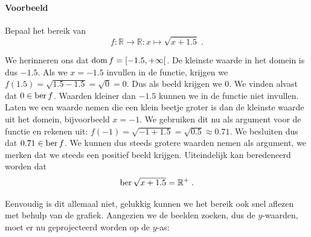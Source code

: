 \documentclass[12pt,twoside]{article}
\begin{document}
\paragraph{Voorbeeld} Bepaal het bereik van $$f:\mathbb{R}\to\mathbb{R}:x\mapsto \sqrt{x+1.5}\;.$$

We herinneren ons dat $\dom f = [-1.5,+\infty[$. De kleinste waarde in het domein is dus $-1.5$. Als we $x=-1.5$ invullen in de functie, krijgen we $f(1.5)=\sqrt{1.5-1.5}=\sqrt{0}=0$. Dus als beeld krijgen we $0$. We vinden alvast dat $0\in\ber f$. Waarden kleiner dan $-1.5$ kunnen we in de functie niet invullen. Laten we een waarde nemen die een klein beetje groter is dan de kleinste waarde uit het domein, bijvoorbeeld $x=-1$. We gebruiken dit nu als argument voor de functie en rekenen uit: $f(-1)=\sqrt{-1+1.5}=\sqrt{0.5}\approx0.71$. We besluiten dus dat $0.71\in\ber f$. We kunnen dus steeds grotere waarden nemen als argument, we merken dat we steeds een positief beeld krijgen. Uiteindelijk kan beredeneerd worden dat
$$\ber \sqrt{x+1.5}=\mathbb{R}^+\;.$$

Eenvoudig is dit allemaal niet, gelukkig kunnen we het bereik ook snel aflezen met behulp van de grafiek. Aangezien we de beelden zoeken, dus de $y$-waarden, moet er nu geprojecteerd worden op de $y$-as:

\begin{center}
\end{center}
\end{document}
